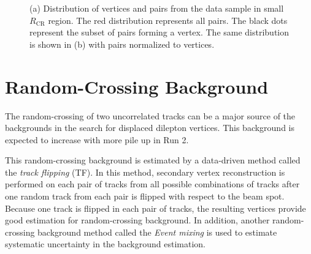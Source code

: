 \begin{figure}[!htb]
    \centering
    \label{fig:cosmicCR} 
	\caption{(a) Distribution of \mumu vertices and pairs from the data sample in small $R_{\mathrm{CR}}$ region. The red distribution represents all \mumu pairs. The black dots represent the subset of pairs forming a \mumu vertex. The same distribution is shown in (b) with \mumu pairs normalized to \mumu vertices.}
\end{figure}



\section{Random-Crossing Background}
\label{sec:bkg:random}

The random-crossing of two uncorrelated tracks can be a major source of the backgrounds in the search for displaced dilepton vertices. This background is expected to increase with more pile up in Run 2.
 
This random-crossing background is estimated by a data-driven method called the \textit{track flipping} (TF). In this method, secondary vertex reconstruction is performed on each pair of tracks from all possible combinations of tracks after one random track from each pair is flipped with respect to the beam spot. Because one track is flipped in each pair of tracks, the resulting vertices provide good estimation for random-crossing background. In addition, another random-crossing background method called the \textit{Event mixing} is used to estimate systematic uncertainty in the background estimation.

